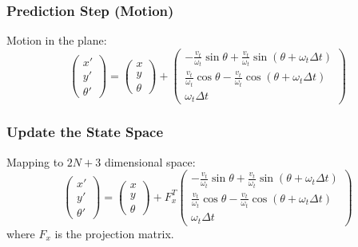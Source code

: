 \begin{frame}
    \frametitle{Prediction Step (Motion)}

    Motion in the plane:
    \[
    \begin{pmatrix} x' \\ y' \\ \theta' \end{pmatrix} = 
    \begin{pmatrix} x \\ y \\ \theta \end{pmatrix} + 
    \begin{pmatrix} 
    -\frac{v_t}{\omega_t} \sin \theta + \frac{v_t}{\omega_t} \sin (\theta + \omega_t \Delta t) \\ 
    \frac{v_t}{\omega_t} \cos \theta - \frac{v_t}{\omega_t} \cos (\theta + \omega_t \Delta t) \\ 
    \omega_t \Delta t 
    \end{pmatrix}
    \]
\end{frame}

\begin{frame}
    \frametitle{Update the State Space}

    Mapping to $2N+3$ dimensional space:
    \[
    \begin{pmatrix}
    x' \\
    y' \\
    \theta'
    \end{pmatrix}
    =
    \begin{pmatrix}
    x \\
    y \\
    \theta
    \end{pmatrix}
    +
    F_x^T
    \begin{pmatrix}
    -\frac{v_t}{\omega_t} \sin \theta + \frac{v_t}{\omega_t} \sin (\theta + \omega_t \Delta t) \\
    \frac{v_t}{\omega_t} \cos \theta - \frac{v_t}{\omega_t} \cos (\theta + \omega_t \Delta t) \\
    \omega_t \Delta t
    \end{pmatrix}
    \]
    where $F_x$ is the projection matrix.
\end{frame}

